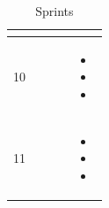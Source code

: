 \documentclass{scrartcl}
\begin{document}
\begin{table}[H]
\begin{center}
\begin{tabular}{| p{1cm}|p{3cm}|p{7.5cm}|p{2.5cm} |p{2.5cm} |}
\begin{itemize}
\end{itemize}\\ \hline
 
  10               &     & & &                 
\begin{itemize}
\item 
\item
\item


 \end{itemize}\\ \hline
 
  11                &     & & &                 
\begin{itemize}
\item 
\item
\item

 \end{itemize}\\ \hline
 
 
 \end{tabular}
\end{center}
\caption{Sprints}
\label{table2}
\end{table}
 
\end{document}
